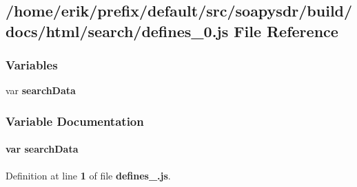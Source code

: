 \subsection{/home/erik/prefix/default/src/soapysdr/build/docs/html/search/defines\+\_\+0.js File Reference}
\label{defines__0_8js}
\subsubsection*{Variables}
\begin{DoxyCompactItemize}
\item 
var {\bf search\+Data}
\end{DoxyCompactItemize}


\subsubsection{Variable Documentation}
\paragraph[{search\+Data}]{\setlength{\rightskip}{0pt plus 5cm}var search\+Data}\label{defines__0_8js_ad01a7523f103d6242ef9b0451861231e}


Definition at line {\bf 1} of file {\bf defines\+\_.\+js}.

